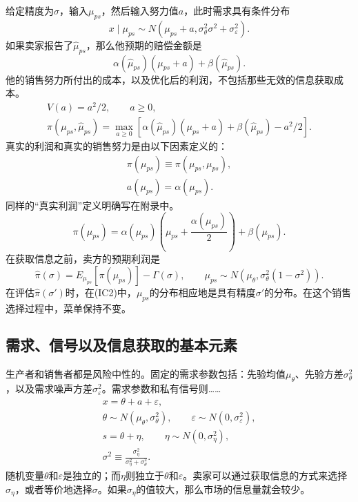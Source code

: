 \documentclass{article}
\begin{document}
给定精度为$\sigma$，输入$\mu_{ps}$，然后输入努力值$a$，此时需求具有条件分布
\begin{equation*}
x\mid\mu_{ps}\sim N\!\left(\mu_{ps}+a,
\sigma_\theta^2\sigma^2+\sigma_\varepsilon^2\right).
\end{equation*}
如果卖家报告了$\widehat{\mu}_{ps}$，那么他预期的赔偿金额是
\begin{equation*}
\alpha(\widehat{\mu}_{ps})(\mu_{ps}+a)+\beta(\widehat{\mu}_{ps}).
\end{equation*}
他的销售努力所付出的成本，以及优化后的利润，不包括那些无效的信息获取成本。
\begin{gather*}
V(a)=a^2/2,\qquad a\geq 0,\\
\pi(\mu_{ps},\widehat{\mu}_{ps})
=\max_{a\geq 0}
\left[\alpha(\widehat{\mu}_{ps})(\mu_{ps}+a)
+\beta(\widehat{\mu}_{ps})-a^2/2\right].
\end{gather*}
真实的利润和真实的销售努力是由以下因素定义的：
\begin{gather*}
\pi(\mu_{ps})\equiv\pi(\mu_{ps},\mu_{ps}),\\
a(\mu_{ps})=\alpha(\mu_{ps}).
\end{gather*}
同样的“真实利润”定义明确写在附录中。
\begin{equation*}
\pi(\mu_{ps})
=\alpha(\mu_{ps})\left(\mu_{ps}+\frac{\alpha(\mu_{ps})}{2}\right)
+\beta(\mu_{ps}).
\end{equation*}
在获取信息之前，卖方的预期利润是
\begin{equation*}
\widehat{\pi}(\sigma)=E_{\mu_{ps}}[\pi(\mu_{ps})]-\Gamma(\sigma),
\qquad
\mu_{ps}\sim N\!\left(\mu_\theta,\sigma_\theta^2(1-\sigma^2)\right).
\end{equation*}
在评估$\widehat{\pi}(\sigma')$时，在(IC2)中，$\mu_{ps}$的分布相应地是具有精度$\sigma'$的分布。在这个销售选择过程中，菜单保持不变。

\subsection*{需求、信号以及信息获取的基本元素}

生产者和销售者都是风险中性的。固定的需求参数包括：先验均值$\mu_\theta$、先验方差$\sigma_\theta^2$，以及需求噪声方差$\sigma_\varepsilon^2$。需求参数和私有信号则……
\begin{gather*}
x=\theta+a+\varepsilon,\\
\theta\sim N(\mu_\theta,\sigma_\theta^2),
\qquad \varepsilon\sim N(0,\sigma_\varepsilon^2),\\
s=\theta+\eta,
\qquad \eta\sim N(0,\sigma_\eta^2),\\
\sigma^2\equiv\frac{\sigma_\eta^2}{\sigma_\eta^2+\sigma_\theta^2}.
\end{gather*}
随机变量$\theta$和$\varepsilon$是独立的；而$\eta$则独立于$\theta$和$\varepsilon$。卖家可以通过获取信息的方式来选择$\sigma_\eta$，或者等价地选择$\sigma$。如果$\sigma_\eta$的值较大，那么市场的信息量就会较少。
\end{document}
